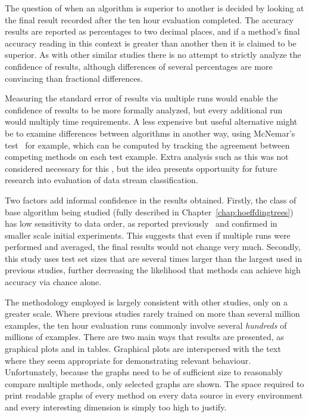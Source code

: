 The question of when an algorithm is superior to another is decided by looking at the final result recorded after the ten hour evaluation completed. The accuracy results are reported as percentages to two decimal places, and if a method's final accuracy reading in this context is greater than another then it is claimed to be superior. As with other similar studies there is no attempt to strictly analyze the confidence of results, although differences of several percentages are more convincing than fractional differences.

Measuring the standard error of results via multiple runs would enable the confidence of results to be more formally analyzed, but every additional run would multiply time requirements. A less expensive but useful alternative might be to examine differences between algorithms in another way, using McNemar's test~\cite{mcnemar} for example, which can be computed by tracking the agreement between competing methods on each test example. Extra analysis such as this was not considered necessary for this \thesisc, but the idea presents opportunity for future research into evaluation of data stream classification.

\BEGINOMIT
Two factors add informal confidence in the results obtained. Firstly, the class of base algorithm being studied (fully described in Chapter~\ref{chap:hoeffdingtrees}) has low sensitivity to data order, as reported previously~\cite{stresstest,ufft} and confirmed in smaller scale initial experiments. This suggests that even if multiple runs were performed and averaged, the final results would not change very much. Secondly, this study uses test set sizes that are several times larger than the largest used in previous studies, further decreasing the likelihood that methods can achieve high accuracy via chance alone.

The methodology employed is largely consistent with other studies, only on a greater scale. Where previous studies rarely trained on more than several million examples, the ten hour evaluation runs commonly involve several {\em hundreds} of millions of examples. There are two main ways that results are presented, as graphical plots and in tables. Graphical plots are interspersed with the text where they seem appropriate for demonstrating relevant behaviour. Unfortunately, because the graphs need to be of sufficient size to reasonably compare multiple methods, only selected graphs are shown. The space required to print readable graphs of every method on every data source in every environment and every interesting dimension is simply too high to justify.

